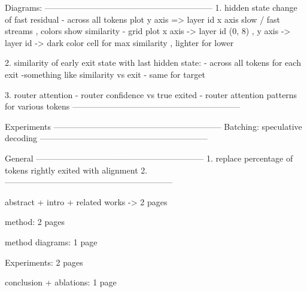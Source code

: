 

Diagrams: 
------------------------------------------------------------
1. hidden state change of fast residual
- across all tokens plot y axis => layer id x axis slow / fast streams , colors show similarity
- grid plot x axis -> layer id (0, 8) , y axis -> layer id -> dark color cell for max similarity , lighter for lower 

2. similarity of early exit state with last hidden state: 
    - across all tokens for each exit -something like similarity vs exit
    - same for target

3. router attention  
- router confidence vs true exited 
- router attention patterns for various tokens
------------------------------------------------------------


Experiments
------------------------------------------------------------
Batching: 
speculative decoding
------------------------------------------------------------


General
------------------------------------------------------------
1. replace percentage of tokens rightly exited with alignment
2. 
------------------------------------------------------------


abstract + intro + related works -> 2 pages

method: 2 pages

method diagrams: 1 page

Experiments: 2 pages

conclusion + ablations: 1 page



